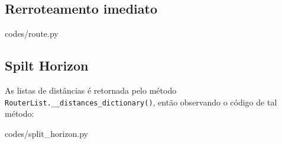\subsection{Rerroteamento imediato}

{codes/route.py}

\subsection{Spilt Horizon}
As listas de distâncias é retornada pelo método \texttt{RouterList.\_\_distances\_dictionary()},
então observando o código de tal método:

{codes/split_horizon.py}

